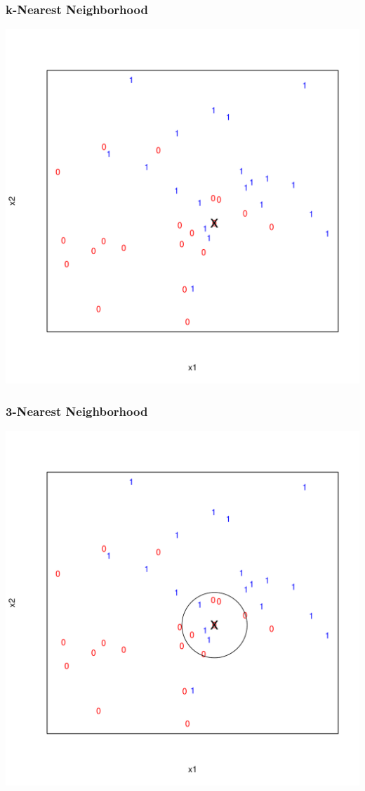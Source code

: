 \documentclass[xcolor=x11names,compress]{beamer}\usepackage[]{graphicx}\usepackage[]{color}
\newenvironment{knitrout}{}{} %
\begin{document}
\begin{frame}
  \frametitle{k-Nearest Neighborhood}
\begin{knitrout}\tiny
{}\color{fgcolor}

{\centering \includegraphics[width=.6\linewidth]{figure/beamer-knn-1} 

}



\end{knitrout}
\end{frame}


\begin{frame}
  \frametitle{3-Nearest Neighborhood}
\begin{knitrout}\tiny
{}\color{fgcolor}

{\centering \includegraphics[width=.6\linewidth]{figure/beamer-knn3-1} 

}



\end{knitrout}
\end{frame}
\end{document}
